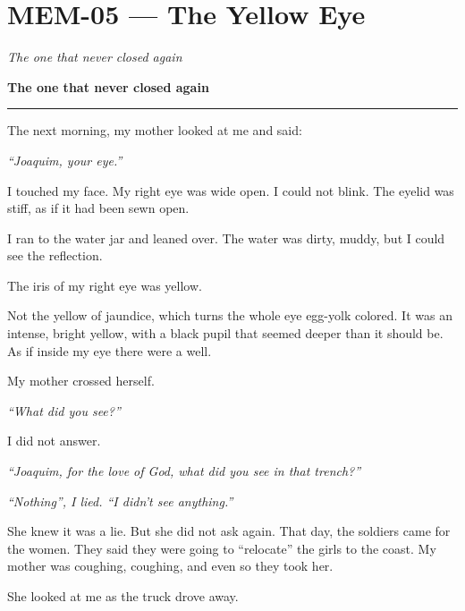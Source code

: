 \section*{\textbf{MEM-05} --- The Yellow Eye}

\noindent \textit{The one that never closed again}

\noindent \textbf{The one that never closed again}

\vspace{0.5em}\noindent\rule{\textwidth}{0.5pt}\vspace{0.5em}

\noindent The next morning, my mother looked at me and said:

\noindent \textit{\textquotedblleft{}Joaquim, your eye.\textquotedblright{}}

\noindent I touched my face. My right eye was wide open. I could not blink. The eyelid was stiff, as if it had been sewn open.

\noindent I ran to the water jar and leaned over. The water was dirty, muddy, but I could see the reflection.

\noindent The iris of my right eye was yellow.

\noindent Not the yellow of jaundice, which turns the whole eye egg-yolk colored. It was an intense, bright yellow, with a black pupil that seemed deeper than it should be. As if inside my eye there were a well.

\noindent My mother crossed herself.

\noindent \textit{\textquotedblleft{}What did you see?\textquotedblright{}}

\noindent I did not answer.

\noindent \textit{\textquotedblleft{}Joaquim, for the love of God, what did you see in that trench?\textquotedblright{}}

\noindent \textit{\textquotedblleft{}Nothing\textquotedblright{}\textit{, I lied. }\textquotedblleft{}I didn't see anything.\textquotedblright{}}

\noindent She knew it was a lie. But she did not ask again. That day, the soldiers came for the women. They said they were going to \textquotedblleft{}relocate\textquotedblright{} the girls to the coast. My mother was coughing, coughing, and even so they took her.

\noindent She looked at me as the truck drove away.

